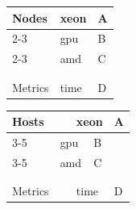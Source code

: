\documentclass{article}
\begin{document}
\begin{tabular}{l|l|l}
\hline
\multirow{5}{*}{Nodes} & xeon & A \\ \cline{2-3}
\multirow{3}{*}{} & gpu & B \\ \cline{2-3}
 & amd & C \\
 & & \\
 & & \\ \hline
Metrics & time & D \\ \hline
\end{tabular}

\begin{tabular}{ll|ll|l}
\hline
\multicolumn{2}{l|}{\multirow{5}{*}{Hosts}} & \multicolumn{2}{l|}{xeon} & A \\ \cline{3-5}
\multicolumn{2}{l|}{\multirow{3}{*}{}} & \multicolumn{2}{l|}{gpu} & B \\ \cline{3-5}
\multicolumn{2}{l|}{} & \multicolumn{2}{l|}{amd} & C \\
\multicolumn{2}{l|}{} & \multicolumn{2}{l|}{} & \\ \hline
\multicolumn{2}{l}{} & \multicolumn{2}{l}{} & \\ \hline
\multicolumn{2}{l|}{Metrics} & \multicolumn{2}{l|}{time} & D \\ \hline
\end{tabular}
\end{document}
